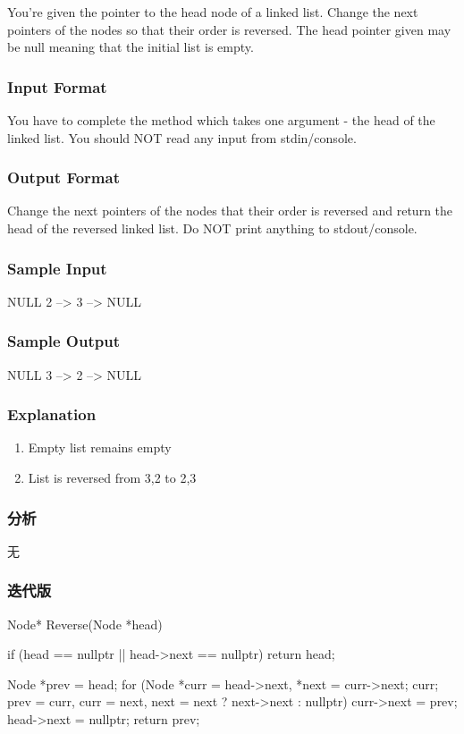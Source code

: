 You’re given the pointer to the head node of a linked list. Change the next pointers of the nodes so that their order is reversed. The head pointer given may be null meaning that the initial list is empty.


\subsubsection{Input Format}
You have to complete the  method which takes one argument - the head of the linked list. You should NOT read any input from stdin/console.


\subsubsection{Output Format}
Change the next pointers of the nodes that their order is reversed and return the head of the reversed linked list. Do NOT print anything to stdout/console.


\subsubsection{Sample Input}
\begin{Code}
NULL
2 –> 3 –> NULL
\end{Code}


\subsubsection{Sample Output}
\begin{Code}
NULL
3 --> 2 --> NULL
\end{Code}


\subsubsection{Explanation}
\begin{enumerate}
\item Empty list remains empty
\item List is reversed from 3,2 to 2,3
\end{enumerate}


\subsubsection{分析}
无


\subsubsection{迭代版}
\begin{Code}
Node* Reverse(Node *head) {
    if (head == nullptr || head->next == nullptr) return head;

    Node *prev = head;
    for (Node *curr = head->next, *next = curr->next; curr;
        prev = curr, curr = next, next = next ? next->next : nullptr) {
        curr->next = prev;
    }
    head->next = nullptr;
    return prev;
}
\end{Code}


